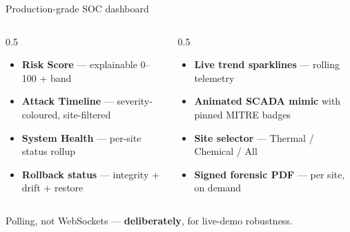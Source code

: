 \documentclass[aspectratio=169,11pt]{beamer}
\newcommand{\hl}[1]{{\color{accent}\textbf{#1}}}
\begin{document}
\begin{frame}{Production-grade SOC dashboard}
\begin{columns}[T]
\begin{column}{0.5\textwidth}
\begin{itemize}\small
  \item \hl{Risk Score} --- explainable 0--100 + band
  \item \hl{Attack Timeline} --- severity-coloured, site-filtered
  \item \hl{System Health} --- per-site status rollup
  \item \hl{Rollback status} --- integrity + drift + restore
\end{itemize}
\end{column}
\begin{column}{0.5\textwidth}
\begin{itemize}\small
  \item \hl{Live trend sparklines} --- rolling telemetry
  \item \hl{Animated SCADA mimic} with pinned MITRE badges
  \item \hl{Site selector} --- Thermal / Chemical / All
  \item \hl{Signed forensic PDF} --- per site, on demand
\end{itemize}
\end{column}
\end{columns}
\vspace{6pt}
\begin{center}\small
Polling, not WebSockets --- \hl{deliberately}, for live-demo robustness.
\end{center}
\end{frame}
\end{document}
